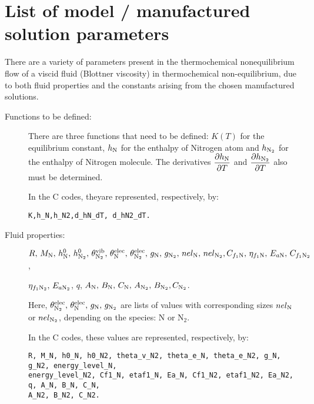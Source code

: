 \section{List of model / manufactured solution parameters}\label{Appendix:01}

There are a variety of parameters present in the thermochemical nonequilibrium flow of a viscid fluid (Blottner viscosity) in thermochemical non-equilibrium, due to both fluid properties and the constants arising from the chosen manufactured solutions.

\begin{description}
\item[Functions to be defined:] There are three functions that need to be defined: $K(T)$ for the equilibrium constant, $h_{\text{N}}$ for the enthalpy of Nitrogen atom and $h_{\text{N}_2}$ for the enthalpy of Nitrogen molecule. The derivatives  $\dfrac{\partial h_{\text{N}} }{\partial T}$ and $\dfrac{\partial h_{\text{N}_2} }{\partial T}$ also must be determined.


\vspace{10pt}
In the C codes, theyare represented, respectively, by:
\vspace{-5pt}
\begin{verbatim}
K,h_N,h_N2,d_hN_dT, d_hN2_dT.
\end{verbatim}



\item[Fluid properties:] $R , \, M_{\text{N}} , \,  h^0_{\text{N}} , \, h^0_{\text{N}_2} , \, \theta^{\text{vib}}_{\text{N}_2} , \, \theta^{\text{elec}}_{\text{N}} , \, 
\theta^{\text{elec}}_{\text{N}_2} , \,   g_{\text{N}} , \,  g_{\text{N}_2} , \,  nel_{\text{N}} , \, nel_{\text{N}_2} ,  C_{f_1 \text{N}} , \,  \eta_{f_1
\text{N}}  , \, E_{a\text{N}} , \,  C_{f_1 \text{N}_2} $,  

$  \eta_{f_1 \text{N}_2},  \,E_{a\text{N}_2}$, $ q$, $A_{\text{N}},\, B_{\text{N}},\, C_{\text{N}},\, A_{\text{N}_2},\, B_{\text{N}_2}, C_{\text{N}_2}$.  

Here,  $ \theta^{\text{elec}}_{\text{N}_2} , \,  \theta^{\text{elec}}_{\text{N}} , \,  g_{\text{N}} , \,  g_{\text{N}_2}$ are lists of values
with corresponding sizes $ nel_{\text{N}}$ or $nel_{\text{N}_2}$,  depending on the species: N or N$_2$.



\vspace{10pt}
In the C codes, these values are represented, respectively, by:
\vspace{-5pt}
\begin{verbatim}
R, M_N, h0_N, h0_N2, theta_v_N2, theta_e_N, theta_e_N2, g_N, g_N2, energy_level_N, 
energy_level_N2, Cf1_N, etaf1_N, Ea_N, Cf1_N2, etaf1_N2, Ea_N2, q, A_N, B_N, C_N, 
A_N2, B_N2, C_N2.


\end{verbatim}
\end{description}
